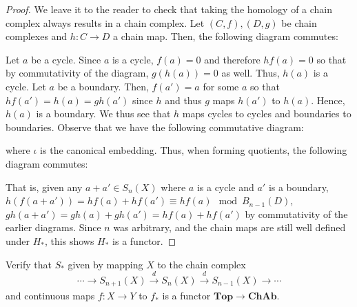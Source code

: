 \documentclass[12pt,reqno]{amsart}
\numberwithin{theorem}{section}
\theoremstyle{definition}
\theoremstyle{remark}
\numberwithin{equation}{section}
\theoremstyle{definition}
\begin{document}
\begin{proof}
We leave it to the reader to check that taking the homology of a chain complex always results in a chain complex. Let $(C,f),(D,g)$ be chain complexes and $h:C\rightarrow D$ a chain map. Then, the following diagram commutes:
    \begin{center}
    \end{center}
   Let $a$ be a cycle. Since $a$ is a cycle, $f(a) = 0$ and therefore $hf(a) = 0$ so that by commutativity of the diagram, $g(h(a)) = 0$ as well. Thus, $h(a)$ is a cycle. Let $a$ be a boundary. Then, $f(a')= a$ for some $a$ so that $hf(a') = h(a) = gh(a')$ since $h$ and thus $g$ maps $h(a')$ to $h(a)$. Hence, $h(a)$ is a boundary. We thus see that $h$ maps cycles to cycles and boundaries to boundaries. Observe that we have the following commutative diagram:
   \begin{center}
\end{center}
where $\iota$ is the canonical embedding. Thus, when forming quotients, the following diagram commutes:
\begin{center}
    \end{center}
    That is, given any $a+a' \in S_n(X)$ where $a$ is a cycle and $a'$ is a boundary, $h(f(a+a')) = hf(a)+hf(a') \equiv hf(a) \mod B_{n-1}(D)$, $gh(a+a') = gh(a)+gh(a') = hf(a)+hf(a')$ by commutativity of the earlier diagrams. Since $n$ was arbitrary, and the chain maps are still well defined under $H_*$, this shows $H_*$ is a functor.
\end{proof}
\begin{exercise}
    Verify that $S_*$ given by mapping $X$ to the chain complex
    $$\cdots\rightarrow S_{n+1}(X)\xrightarrow[]{d}S_n(X)\xrightarrow[]{d}S_{n-1}(X)\rightarrow \cdots$$
    and continuous maps $f:X\rightarrow Y$ to $f_*$ is a functor $\mathbf{Top}\rightarrow \mathbf{ChAb}$. 
\end{exercise}
\end{document}
